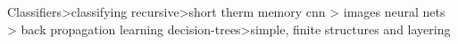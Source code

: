 Classifiers>classifying 
recursive>short therm memory
cnn > images
neural nets > back propagation learning
decision-trees>simple, finite
structures and layering